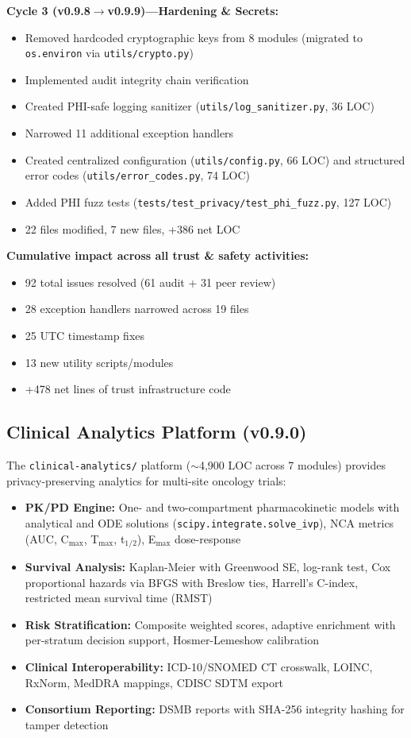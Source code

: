 \documentclass[10pt]{article}
\begin{document}
\textbf{Cycle 3 (v0.9.8$\to$v0.9.9)---Hardening \& Secrets:}
\begin{itemize}
  \item Removed hardcoded cryptographic keys from 8 modules (migrated to \texttt{os.environ} via \texttt{utils/crypto.py})
  \item Implemented audit integrity chain verification
  \item Created PHI-safe logging sanitizer (\texttt{utils/log\_sanitizer.py}, 36 LOC)
  \item Narrowed 11 additional exception handlers
  \item Created centralized configuration (\texttt{utils/config.py}, 66 LOC) and structured error codes (\texttt{utils/error\_codes.py}, 74 LOC)
  \item Added PHI fuzz tests (\texttt{tests/test\_privacy/test\_phi\_fuzz.py}, 127 LOC)
  \item 22 files modified, 7 new files, +386 net LOC
\end{itemize}

\textbf{Cumulative impact across all trust \& safety activities:}
\begin{itemize}
  \item 92 total issues resolved (61 audit + 31 peer review)
  \item 28 exception handlers narrowed across 19 files
  \item 25 UTC timestamp fixes
  \item 13 new utility scripts/modules
  \item +478 net lines of trust infrastructure code
\end{itemize}

\subsection{Clinical Analytics Platform (v0.9.0)}

The \texttt{clinical-analytics/} platform ($\sim$4,900 LOC across 7 modules) provides privacy-preserving analytics for multi-site oncology trials:

\begin{itemize}
  \item \textbf{PK/PD Engine:} One- and two-compartment pharmacokinetic models with analytical and ODE solutions (\texttt{scipy.integrate.solve\_ivp}), NCA metrics (AUC, C$_{\text{max}}$, T$_{\text{max}}$, t$_{1/2}$), E$_{\text{max}}$ dose-response
  \item \textbf{Survival Analysis:} Kaplan-Meier with Greenwood SE, log-rank test, Cox proportional hazards via BFGS with Breslow ties, Harrell's C-index, restricted mean survival time (RMST)
  \item \textbf{Risk Stratification:} Composite weighted scores, adaptive enrichment with per-stratum decision support, Hosmer-Lemeshow calibration
  \item \textbf{Clinical Interoperability:} ICD-10/SNOMED CT crosswalk, LOINC, RxNorm, MedDRA mappings, CDISC SDTM export~\cite{cdisc2024sdtm}
  \item \textbf{Consortium Reporting:} DSMB reports with SHA-256 integrity hashing for tamper detection
\end{itemize}
\end{document}
